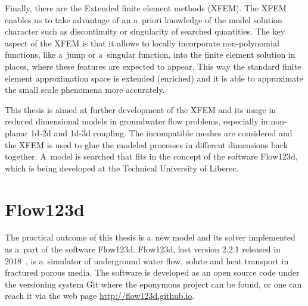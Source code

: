 Finally, there are the Extended finite element methods (XFEM).
The XFEM enables us to take advantage of an a~priori knowledge of the model solution character
such as discontinuity or singularity of searched quantities.
The key aspect of the XFEM is that it allows to locally incorporate non-polynomial functions, like a~jump or a~singular function,
into the finite element solution in places, where these features are expected to appear.
This way the standard finite element approximation space is extended (enriched) and it is able to approximate the small scale phenomena
more accurately.

This thesis is aimed at further development of the XFEM and its usage in reduced dimensional models in groundwater flow problems,
especially in non-planar 1d-2d and 1d-3d coupling. The incompatible meshes are considered and
the XFEM is used to glue the modeled processes in different dimensions back together. 
A~model is searched that fits in the concept of the software Flow123d, which is being developed at the
Technical University of Liberec.




\section{Flow123d}
\label{sec:soa_flow123d}

The practical outcome of this thesis is a~new model and its solver implemented as a~part of the software Flow123d.
Flow123d, last version 2.2.1 released in 2018~\cite{flow123d}, is a~simulator of underground water flow, solute
and heat transport in fractured porous media.
The software is developed as an open source code under the versioning system Git where the eponymous project can be found, or 
one can reach it via the web page \url{http://flow123d.github.io}.
%

